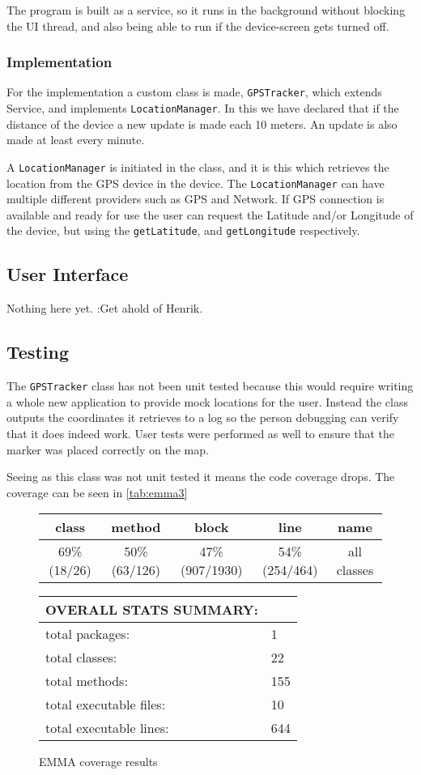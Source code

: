 The program is built as a service, so it runs in the background without blocking the UI thread, and also being able to run if the device-screen gets turned off.


\subsubsection{Implementation}
For the implementation a custom class is made, \texttt{GPSTracker}, which extends Service, and implements \texttt{LocationManager}.
In this we have declared that if the distance of the device a new update is made each 10 meters. An update is also made at least every minute.

A \texttt{LocationManager} is initiated in the class, and it is this which retrieves the location from the \ac{GPS} device in the device. The \texttt{LocationManager} can have multiple different providers such as \ac{GPS} and Network.
If \ac{GPS} connection is available and ready for use the user can request the Latitude and/or Longitude of the device, but using the \texttt{getLatitude}, and \texttt{getLongitude} respectively.

\subsection{User Interface}
Nothing here yet. \todo:Get ahold of Henrik.

\subsection{Testing}
The \texttt{GPSTracker} class has not been unit tested because this would require writing a whole new application to provide mock locations for the user. Instead the class outputs the coordinates it retrieves to a log so the person debugging can verify that it does indeed work. User tests were performed as well to ensure that the marker was placed correctly on the map.

Seeing as this class was not unit tested it means the code coverage drops. The coverage can be seen in \autoref{tab:emma3}

\begin{figure}[ht]
\caption{EMMA coverage results}
\label{tab:emma3}
\begin{tabular}{| c | c | c | c | c |}
\hline
class & method & block & line & name \\ \hline
69\% (18/26) & 50\% (63/126) & 47\% (907/1930) & 54\% (254/464) & all classes \\
\hline
\end{tabular}
\vspace{10pt}

\begin{tabular}{| l | l |}
\hline
OVERALL STATS SUMMARY: & \\ \hline
total packages: & 1 \\
total classes: & 22 \\
total methods: & 155 \\
total executable files: & 10 \\
total executable lines: & 644 \\
\hline
\end{tabular}
\end{figure}